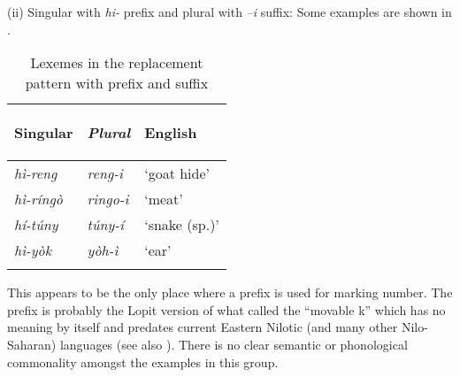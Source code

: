 \documentclass[output=paper]{langsci/langscibook}
\begin{document}
\begin{table}
\caption{Person referent nouns in singular and plural}
\label{tab:moodie:14}
\end{table}

(ii) Singular with \textit{hi-} prefix and plural with \textit{–i} suffix: Some examples are shown in . 

\begin{table}

\begin{tabularx}{.66\textwidth}{>{\itshape}X>{\itshape}XX}
\lsptoprule

 \textup{Singular} & \textup{Plural} & {English}\\ \midrule
 hì-reng &  reng-i & ‘goat hide’\\
 hì-ríngò &  ringo-i & ‘meat’\\
 hí-túny &  túny-í & ‘snake (sp.)’\\
 hì-yòk &  yòh-ì & ‘ear’\\
\lspbottomrule
\end{tabularx}
\caption{Lexemes in the replacement pattern with prefix and suffix}
\label{tab:moodie:15}
\end{table}

This appears to be the only place where a prefix is used for marking number. The prefix is probably the Lopit version of what \citet{Greenberg1981} called the “movable k” which has no meaning by itself and predates current Eastern Nilotic (and many other Nilo-Saharan) languages (see also \citealt[251]{Dimmendaal1983}). There is no clear semantic or phonological commonality amongst the examples in this group.
\end{document}
